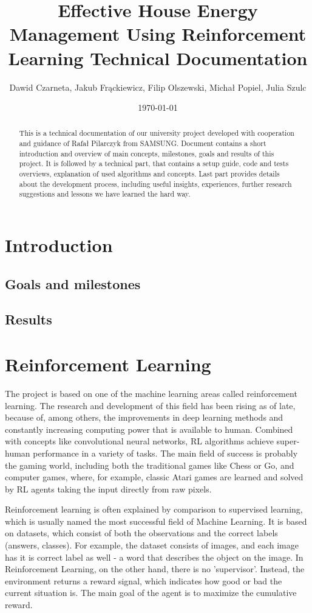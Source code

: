 \documentclass{article}
\title{Effective House Energy Management Using Reinforcement Learning Technical Documentation} %
\author{Dawid Czarneta, Jakub Frąckiewicz, Filip Olszewski, Michał Popiel, Julia Szulc}
\date{\today}
\begin{document}
\maketitle

\begin{abstract}
This is a technical documentation of our university project developed with cooperation and guidance of Rafał Pilarczyk from SAMSUNG. Document contains a short introduction and overview of main concepts, milestones, goals and results of this project. It is followed by a technical part, that contains a setup guide, code and tests overviews, explanation of used algorithms and concepts. Last part provides details about the development process, including useful insights, experiences, further research suggestions and lessons we have learned the hard way.
\end{abstract}

\section{Introduction}

\subsection{Goals and milestones}
\subsection{Results}

\section{Reinforcement Learning}
The project is based on one of the machine learning areas called reinforcement learning. The research and development of this field has been rising as of late, because of, among others, the improvements in deep learning methods and constantly increasing computing power that is available to human. Combined with concepts like convolutional neural networks, RL algorithms achieve super-human performance in a variety of tasks. The main field of success is probably the gaming world, including both the traditional games like Chess or Go, and computer games, where, for example, classic Atari games are learned and solved by RL agents taking the input directly from raw pixels.

Reinforcement learning is often explained by comparison to supervised learning, which is usually named the most successful field of Machine Learning. It is based on datasets, which consist of both the observations and the correct labels (answers, classes). For example, the dataset consists of images, and each image has it is correct label as well - a word that describes the object on the image. In Reinforcement Learning, on the other hand, there is no 'supervisor'. Instead, the environment returns a reward signal, which indicates how good or bad the current situation is. The main goal of the agent is to maximize the cumulative reward.
\end{document}
